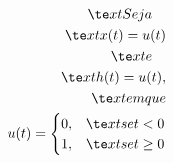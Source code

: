 \documentclass[preview]{standalone}
\begin{document}
\begin{align*}
\te x t{Seja } \quad \\ \te x t{ x (t)} = u(t) \\ \te x t{ e } \quad \\ \te x t{ h (t)} = u(t),\\ \te x t{ em que } \\ u(t) = \begin{cases} 0, & \te x t{se } t < 0 \\ 1, & \te x t{se } t \geq 0 \end{cases}
\end{align*}
\end{document}
